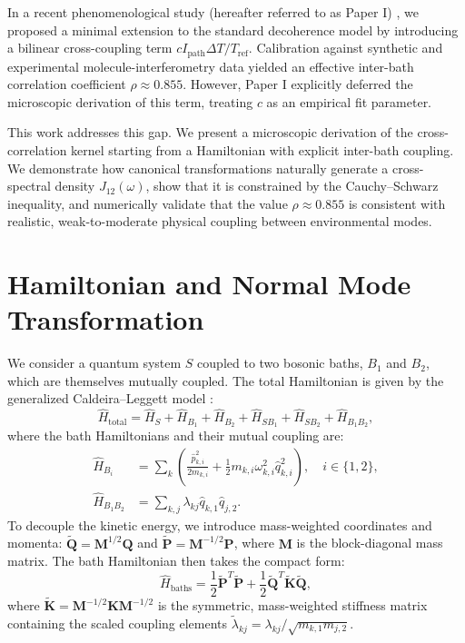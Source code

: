 \documentclass[aps,pra,reprint,amsmath,amssymb,superscriptaddress]{revtex4-2}
\begin{document}
In a recent phenomenological study (hereafter referred to as Paper I) \cite{Berramdane2026}, we proposed a minimal extension to the standard decoherence model by introducing a bilinear cross-coupling term $c I_{\text{path}} \Delta T / T_{\text{ref}}$. Calibration against synthetic and experimental molecule-interferometry data yielded an effective inter-bath correlation coefficient $\rho \approx 0.855$. However, Paper I explicitly deferred the microscopic derivation of this term, treating $c$ as an empirical fit parameter.

This work addresses this gap. We present a microscopic derivation of the cross-correlation kernel starting from a Hamiltonian with explicit inter-bath coupling. We demonstrate how canonical transformations naturally generate a cross-spectral density $J_{12}(\omega)$, show that it is constrained by the Cauchy--Schwarz inequality, and numerically validate that the value $\rho \approx 0.855$ is consistent with realistic, weak-to-moderate physical coupling between environmental modes.

\section{Hamiltonian and Normal Mode Transformation}
We consider a quantum system $S$ coupled to two bosonic baths, $B_1$ and $B_2$, which are themselves mutually coupled. The total Hamiltonian is given by the generalized Caldeira--Leggett model \cite{Caldeira1983}:
\begin{equation}
\hat{H}_{\text{total}} = \hat{H}_S + \hat{H}_{B_1} + \hat{H}_{B_2} + \hat{H}_{SB_1} + \hat{H}_{SB_2} + \hat{H}_{B_1 B_2},
\label{eq:H_total}
\end{equation}
where the bath Hamiltonians and their mutual coupling are:
\begin{align}
\hat{H}_{B_i} &= \sum_{k} \left( \frac{\hat{p}_{k,i}^2}{2m_{k,i}} + \frac{1}{2} m_{k,i} \omega_{k,i}^2 \hat{q}_{k,i}^2 \right), \quad i \in \{1, 2\}, \\
\hat{H}_{B_1 B_2} &= \sum_{k,j} \lambda_{kj} \hat{q}_{k,1} \hat{q}_{j,2}.
\label{eq:H_bath_coupling}
\end{align}
To decouple the kinetic energy, we introduce mass-weighted coordinates and momenta: $\tilde{\mathbf{Q}} = \mathbf{M}^{1/2} \mathbf{Q}$ and $\tilde{\mathbf{P}} = \mathbf{M}^{-1/2} \mathbf{P}$, where $\mathbf{M}$ is the block-diagonal mass matrix. The bath Hamiltonian then takes the compact form:
\begin{equation}
\hat{H}_{\text{baths}} = \frac{1}{2} \tilde{\mathbf{P}}^T \tilde{\mathbf{P}} + \frac{1}{2} \tilde{\mathbf{Q}}^T \tilde{\mathbf{K}} \tilde{\mathbf{Q}},
\label{eq:H_mass_weighted}
\end{equation}
where $\tilde{\mathbf{K}} = \mathbf{M}^{-1/2} \mathbf{K} \mathbf{M}^{-1/2}$ is the symmetric, mass-weighted stiffness matrix containing the scaled coupling elements $\tilde{\lambda}_{kj} = \lambda_{kj} / \sqrt{m_{k,1} m_{j,2}}$.
\end{document}

